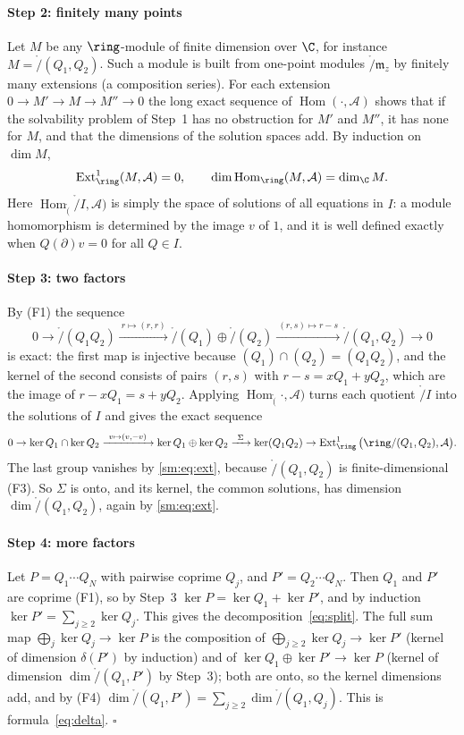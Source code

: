 \paragraph{Step 2: finitely many points} Let $M$ be any $\ring$-module of finite dimension over $\C$, for instance
$M=\ring/(Q_1,Q_2)$. Such a module is built from one-point modules $\ring/\mathfrak m_z$ by finitely many extensions
(a composition series). For each extension $0\to M'\to M\to M''\to0$ the long exact sequence of
$\operatorname{Hom}(\cdot,\mathcal A)$ shows that if the solvability problem of Step~1 has no obstruction for $M'$ and
$M''$, it has none for $M$, and that the dimensions of the solution spaces add. By induction on $\dim M$,
\begin{equation}\label{sm:eq:ext}
  \operatorname{Ext}^1_\ring(M,\mathcal A)=0,\qquad \dim\operatorname{Hom}_\ring(M,\mathcal A)=\dim_\C M .
\end{equation}
Here $\operatorname{Hom}_\ring(\ring/I,\mathcal A)$ is simply the space of solutions of all equations in $I$: a module
homomorphism is determined by the image $v$ of $1$, and it is well defined exactly when $Q(\partial)v=0$ for all $Q\in I$.

\paragraph{Step 3: two factors} By (F1) the sequence
\[
  0\to\ring/(Q_1Q_2)\xrightarrow{\ r\mapsto(r,r)\ }\ring/(Q_1)\oplus\ring/(Q_2)\xrightarrow{\ (r,s)\mapsto r-s\ }\ring/(Q_1,Q_2)\to0
\]
is exact: the first map is injective because $(Q_1)\cap(Q_2)=(Q_1Q_2)$, and the kernel of the second consists of pairs
$(r,s)$ with $r-s=xQ_1+yQ_2$, which are the image of $r-xQ_1=s+yQ_2$. Applying $\operatorname{Hom}_\ring(\cdot,\mathcal A)$
turns each quotient $\ring/I$ into the solutions of $I$ and gives the exact sequence
\[
  0\to\ker Q_1\cap\ker Q_2\xrightarrow{\ v\mapsto(v,-v)\ }\ker Q_1\oplus\ker Q_2\xrightarrow{\ \Sigma\ }\ker(Q_1Q_2)\to
  \operatorname{Ext}^1_\ring\big(\ring/(Q_1,Q_2),\mathcal A\big).
\]
The last group vanishes by \eqref{sm:eq:ext}, because $\ring/(Q_1,Q_2)$ is finite-dimensional (F3). So $\Sigma$ is onto,
and its kernel, the common solutions, has dimension $\dim\ring/(Q_1,Q_2)$, again by \eqref{sm:eq:ext}.

\paragraph{Step 4: more factors} Let $P=Q_1\cdots Q_N$ with pairwise coprime $Q_j$, and $P'=Q_2\cdots Q_N$. Then $Q_1$ and
$P'$ are coprime (F1), so by Step~3 $\ker P=\ker Q_1+\ker P'$, and by induction $\ker P'=\sum_{j\ge2}\ker Q_j$. This gives
the decomposition~\eqref{eq:split}. The full sum map $\bigoplus_j\ker Q_j\to\ker P$ is the composition of
$\bigoplus_{j\ge2}\ker Q_j\to\ker P'$ (kernel of dimension $\delta(P')$ by induction) and of
$\ker Q_1\oplus\ker P'\to\ker P$ (kernel of dimension $\dim\ring/(Q_1,P')$ by Step~3); both are onto, so the kernel
dimensions add, and by (F4) $\dim\ring/(Q_1,P')=\sum_{j\ge2}\dim\ring/(Q_1,Q_j)$. This is formula~\eqref{eq:delta}.
\hfill$\square$

